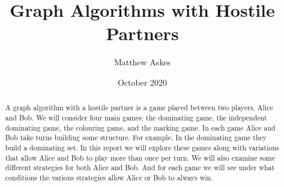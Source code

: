 \documentclass[11pt
              , a4paper
              , twoside
              , openright
              ]{book}
\title{Graph Algorithms with Hostile Partners}
\author{Matthew Askes}
\date{October 2020}
\theoremstyle{definition}
\begin{document}
    
\frontmatter

\begin{abstract}

A graph algorithm with a hostile partner is a game played between two players, Alice and Bob. We will consider four main games; the dominating game, the independent dominating game, the colouring game, and the marking game. In each game Alice and Bob take turns building some structure. For example, In the dominating game they build a dominating set. In this report we will explore these games along with variations that allow Alice and Bob to play more than once per turn. We will also examine some different strategies for both Alice and Bob. And for each game we will see under what conditions the various strategies allow Alice or Bob to always win.   

\end{abstract}

\maketitle

%
\tableofcontents

\listoffigures


\mainmatter







\backmatter


\end{document}
